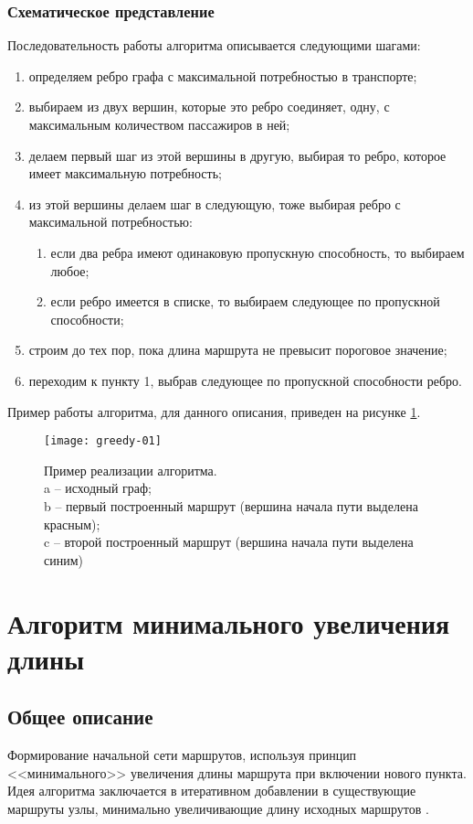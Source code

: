 \subsubsection{Схематическое представление}
Последовательность работы алгоритма описывается следующими шагами:
\begin{enumerate}
    \item определяем ребро графа с максимальной потребностью в транспорте;
    \item выбираем из двух вершин, которые это ребро соединяет, одну, с максимальным количеством 
        пассажиров в ней;
    \item делаем первый шаг из этой вершины в другую, выбирая то ребро, которое имеет максимальную 
        потребность;
    \item из этой вершины делаем шаг в следующую, тоже выбирая ребро с максимальной потребностью:
    \begin{enumerate}
        \item если два ребра имеют одинаковую пропускную способность, то выбираем любое;
        \item если ребро имеется в списке, то выбираем следующее по пропускной способности;
    \end{enumerate}
    \item строим до тех пор, пока длина маршрута не превысит пороговое значение;
    \item переходим к пункту 1, выбрав следующее по пропускной способности ребро.
\end{enumerate}

Пример работы алгоритма, для данного описания, приведен на рисунке \ref{img:greedy-01}.
\begin{figure}[h!]
    \centering
    \texttt{[image: greedy-01]}
    \caption{Пример реализации алгоритма.\\
        a -- исходный граф;\\
        b -- первый построенный маршрут (вершина начала пути выделена красным);\\
        c -- второй построенный маршрут (вершина начала пути выделена синим)
    }
   \label{img:greedy-01}
\end{figure}

\section{Алгоритм минимального увеличения длины}\label{sec:second_alg}
\subsection{Общее описание}
Формирование начальной сети маршрутов, используя принцип <<минимального>> увеличения длины маршрута при 
включении нового пункта. Идея алгоритма заключается в итеративном добавлении в существующие маршруты узлы, 
минимально увеличивающие длину исходных маршрутов \cite{bib:20.2,bib:20.3}. 

